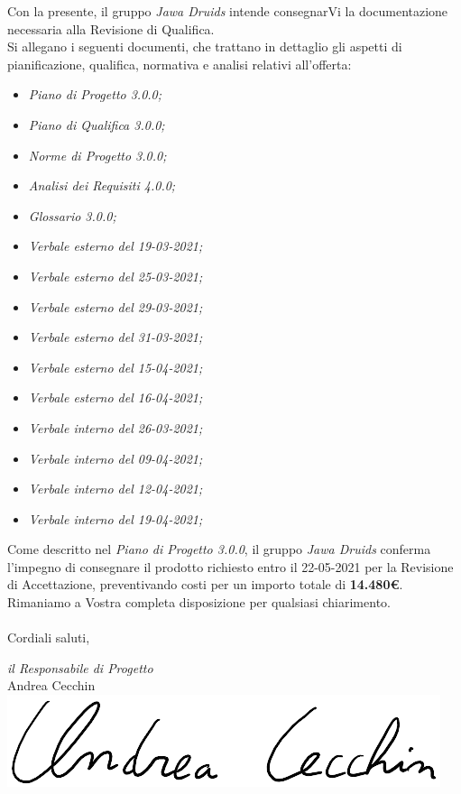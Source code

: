\documentclass[a4paper,12pt]{report}
\begin{document}
Con la presente, il gruppo \textit{Jawa Druids} intende consegnarVi la documentazione necessaria alla Revisione di Qualifica.
\vspace{1cm}
\\
Si allegano i seguenti documenti, che trattano in dettaglio gli aspetti di pianificazione, qualifica, normativa e analisi relativi all'offerta:
\begin{itemize}
  \item \textit{Piano di Progetto 3.0.0;}
  \item \textit{Piano di Qualifica 3.0.0;}
  \item \textit{Norme di Progetto 3.0.0;}
  \item \textit{Analisi dei Requisiti 4.0.0;}
  \item \textit{Glossario 3.0.0;}
  \item \textit{Verbale esterno del 19-03-2021;}
  \item \textit{Verbale esterno del 25-03-2021;}
  \item \textit{Verbale esterno del 29-03-2021;}
  \item \textit{Verbale esterno del 31-03-2021;}
  \item \textit{Verbale esterno del 15-04-2021;}
  \item \textit{Verbale esterno del 16-04-2021;}
  \item \textit{Verbale interno del 26-03-2021;}
  \item \textit{Verbale interno del 09-04-2021;}
  \item \textit{Verbale interno del 12-04-2021;}
  \item \textit{Verbale interno del 19-04-2021;}
\end{itemize}
\vspace{0.7cm}

Come descritto nel \textit{Piano di Progetto 3.0.0}, il gruppo \textit{Jawa Druids} conferma l’impegno di consegnare il prodotto richiesto entro il 22-05-2021 per la Revisione di Accettazione, preventivando costi per un importo totale di \textbf{14.480\euro}.\\
Rimaniamo a Vostra completa disposizione per qualsiasi chiarimento.\\
\vspace{0.3cm}
\\
Cordiali saluti,
\begin{flushright}
  \textit{il Responsabile di Progetto} \\
  Andrea Cecchin \\
  \includegraphics[width=0.3\linewidth]{immagini/firme/firma_andrea_c.png}\\[4ex]
\end{flushright}
\end{document}
